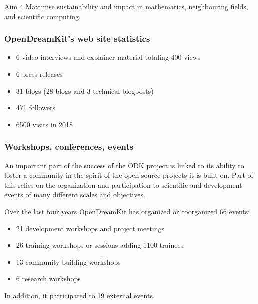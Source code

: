 \begin{recommendation}{Aim 4}
  Maximise sustainability and impact in mathematics, neighbouring
  fields, and scientific computing.
\end{recommendation}

\subsubsection{OpenDreamKit's web site statistics}

\begin{itemize}
\item 6 video interviews and explainer material totaling 400 views
\item 6 press releases
\item 31 blogs (28 blogs and 3 technical blogposts)
\item 471 followers
\item 6500 visits in 2018
\end{itemize}

\subsubsection{Workshops, conferences, events}



An important part of the success of the ODK project is linked to its
ability to foster a community in the spirit of the open source
projects it is built on. Part of this relies on the organization and
participation to scientific and development events of many different
scales and objectives.

Over the last four years OpenDreamKit has organized or coorganized 66
events:
\begin{itemize}
\item 21 development workshops and project meetings
\item 26 training workshops or sessions adding 1100 trainees
\item 13 community building workshops
\item 6 research workshops
\end{itemize}
In addition, it participated to 19 external events.

